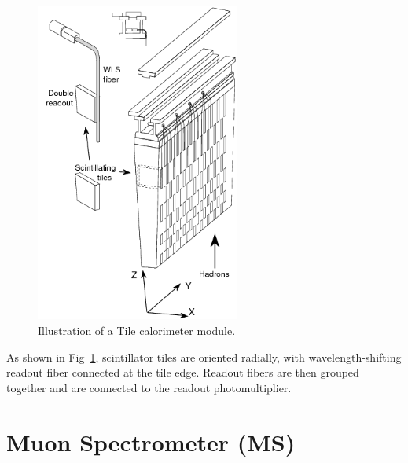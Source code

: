 \begin{figure}[htbp!]
    \centering
    \includegraphics[width=0.6\textwidth]{chapters/c4/figures/tile}
    \caption{Illustration of a Tile calorimeter module.}
    \label{fig:Tile}
\end{figure}

\par As shown in Fig~\ref{fig:Tile}, scintillator tiles are oriented radially, with wavelength-shifting readout fiber connected at the tile edge. Readout fibers are then grouped together and are connected to the readout photomultiplier.

\section{Muon Spectrometer (MS)}
\label{sec:muon}

